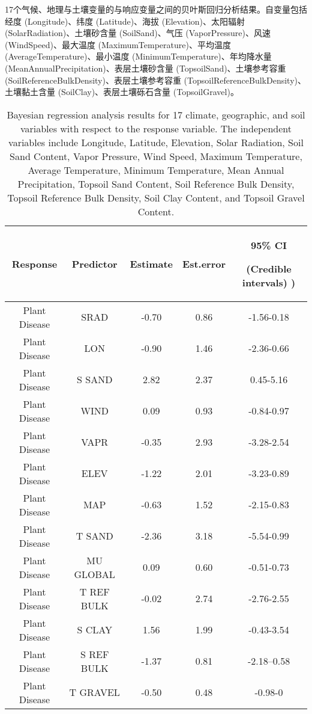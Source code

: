 \documentclass[AutoFakeBold]{LZUThesis-PgD&PhD}
\begin{document}
	
	\begin{table}[H]
		\centering
		\caption{17个气候、地理与土壤变量的与响应变量之间的贝叶斯回归分析结果。自变量包括经度 (Longitude)、纬度 (Latitude)、海拔 (Elevation)、太阳辐射 (SolarRadiation)、土壤砂含量 (SoilSand)、气压 (VaporPressure)、风速 (WindSpeed)、最大温度 (MaximumTemperature)、平均温度 (AverageTemperature)、最小温度 (MinimumTemperature)、年均降水量 (MeanAnnualPrecipitation)、表层土壤砂含量 (TopsoilSand)、土壤参考容重 (SoilReferenceBulkDensity)、表层土壤参考容重 (TopsoilReferenceBulkDensity)、土壤黏土含量 (SoilClay)、表层土壤砾石含量 (TopsoilGravel)。}
		\caption*{Bayesian regression analysis results for 17 climate, geographic, and soil variables with respect to the response variable. The independent variables include Longitude, Latitude, Elevation, Solar Radiation, Soil Sand Content, Vapor Pressure, Wind Speed, Maximum Temperature, Average Temperature, Minimum Temperature, Mean Annual Precipitation, Topsoil Sand Content, Soil Reference Bulk Density, Topsoil Reference Bulk Density, Soil Clay Content, and Topsoil Gravel Content.}
		\begin{tabular}{ccccc}
			\hline
			Response & Predictor & Estimate & Est.error & 95\% CI \par (Credible intervals) ) \\ 
			\hline
			Plant Disease & SRAD & -0.70 & 0.86 & -1.56-0.18 \\ 
			Plant Disease & LON & -0.90 & 1.46 & -2.36-0.66 \\ 
			Plant Disease & S SAND & 2.82 & 2.37 & 0.45-5.16 \\ 
			Plant Disease & WIND & 0.09 & 0.93 & -0.84-0.97 \\ 
			Plant Disease & VAPR & -0.35 & 2.93 & -3.28-2.54 \\ 
			Plant Disease & ELEV & -1.22 & 2.01 & -3.23-0.89 \\ 
			Plant Disease & MAP & -0.63 & 1.52 & -2.15-0.83 \\ 
			Plant Disease & T SAND & -2.36 & 3.18 & -5.54-0.99 \\ 
			Plant Disease & MU GLOBAL & 0.09 & 0.60 & -0.51-0.73 \\ 
			Plant Disease & T REF BULK & -0.02 & 2.74 & -2.76-2.55 \\ 
			Plant Disease & S CLAY & 1.56 & 1.99 & -0.43-3.54 \\ 
			Plant Disease & S REF BULK & -1.37 & 0.81 & -2.18--0.58 \\ 
			Plant Disease & T GRAVEL & -0.50 & 0.48 & -0.98-0 \\ 
			\hline
		\end{tabular}
		
	\end{table}
	
\end{document}
